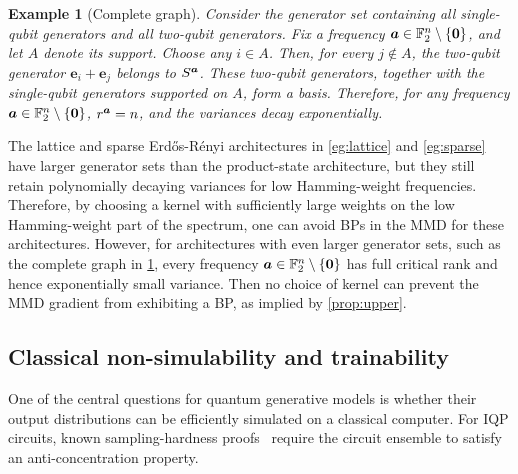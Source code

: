 \documentclass{article}
\theoremstyle{plain}
\newtheorem{example}[theorem]{Example}
\theoremstyle{definition}
\theoremstyle{remark}
\begin{document}
\begin{example}[Complete graph] \label{eg:complete} Consider the generator set containing all single-qubit generators and all two-qubit generators. Fix a frequency ${\bm{a}} \in \mathbb{F}_2^n \setminus \{\bm{0}\}$, and let $A$ denote its support. Choose any $i\in A$. Then, for every $j\notin A$, the two-qubit generator $\bm{e}_i+\bm{e}_j$ belongs to $S^{\bm{a}}$. These two-qubit generators, together with the single-qubit generators supported on $A$, form a basis. Therefore, for any frequency ${\bm{a}} \in \mathbb{F}_2^n \setminus \{\bm{0}\}$, $r^{\bm{a}} =n$, and the variances decay exponentially.
\end{example}

The lattice and sparse Erd\H os-R\'enyi architectures in \cref{eg:lattice} and \cref{eg:sparse} have larger generator sets than the product-state architecture, but they still retain polynomially decaying variances for low Hamming-weight frequencies. Therefore, by choosing a kernel with sufficiently large weights on the low Hamming-weight part of the spectrum, one can avoid BPs in the MMD for these architectures. However, for architectures with even larger generator sets, such as the complete graph in \cref{eg:complete}, every frequency ${\bm{a}} \in \mathbb{F}_2^n \setminus \{\bm{0}\}$ has full critical rank and hence exponentially small variance. Then no choice of kernel can prevent the MMD gradient from exhibiting a BP, as implied by \cref{prop:upper}.

\subsection{Classical non-simulability and trainability}\label{subsec:non-simulability}
One of the central questions for quantum generative models is whether their output distributions can be efficiently simulated on a classical computer. For IQP circuits, known sampling-hardness proofs~\cite{Bremner17} require the circuit ensemble to satisfy an anti-concentration property.
\end{document}
